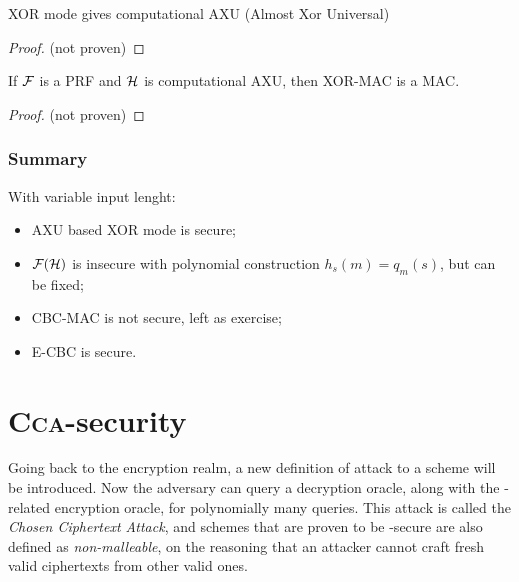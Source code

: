 
\begin{lemma}
    XOR mode gives computational AXU (Almost Xor Universal)
\end{lemma}

\begin{proof}
    (not proven)
\end{proof}

\begin{theorem}
    If $\mathcal{F}$ is a PRF and $\mathcal{H}$ is computational AXU, then XOR-MAC is a MAC.
\end{theorem}

\begin{proof}
    (not proven)
\end{proof}

\subsubsection{Summary}


With variable input lenght:
\begin{itemize}
    \item AXU based XOR mode is secure;
    \item $\mathcal{F}(\mathcal{H})$ is insecure with polynomial construction $h_{s}(m)=q_{m}(s)$, but can be fixed;
    \item CBC-MAC is not secure, left as exercise;
    \item E-CBC is secure.
\end{itemize}

\pagebreak

\section{\textsc{Cca}-security}

Going back to the encryption realm, a new definition of attack to a \ske{} scheme will be introduced. Now the adversary can query a decryption oracle, along with the \cpa-related encryption oracle, for polynomially many queries. This attack is called the \emph{Chosen Ciphertext Attack}\footnotemark, and schemes that are proven to be \cca-secure are also defined as \emph{non-malleable}, on the reasoning that an attacker cannot craft fresh valid ciphertexts from other valid ones.

